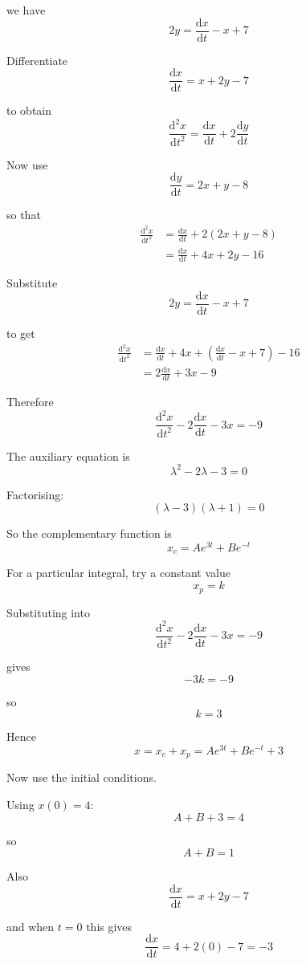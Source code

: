 \documentclass[leqno]{article}
\begin{document}
\begin{enumerate}[
  label=\textbf{\arabic*.},
  leftmargin=*,
  topsep=0pt,
  partopsep=0pt,
  parsep=0pt
]
\begin{djsSolution}
\begin{enumerate}[label=\textbf{(\alph*)}]
  we have
  \[
  2y=\frac{\mathrm{d}x}{\mathrm{d}t}-x+7
  \]

  Differentiate
  \[
  \frac{\mathrm{d}x}{\mathrm{d}t}=x+2y-7
  \]

  to obtain
  \[
  \frac{\mathrm{d}^2x}{\mathrm{d}t^2}
  =
  \frac{\mathrm{d}x}{\mathrm{d}t}
  +2\frac{\mathrm{d}y}{\mathrm{d}t}
  \]

  Now use
  \[
  \frac{\mathrm{d}y}{\mathrm{d}t}=2x+y-8
  \]

  so that
  \begin{align*}
  \frac{\mathrm{d}^2x}{\mathrm{d}t^2}
  &=\frac{\mathrm{d}x}{\mathrm{d}t}+2(2x+y-8)\\
  &=\frac{\mathrm{d}x}{\mathrm{d}t}+4x+2y-16
  \end{align*}

  Substitute
  \[
  2y=\frac{\mathrm{d}x}{\mathrm{d}t}-x+7
  \]

  to get
  \begin{align*}
  \frac{\mathrm{d}^2x}{\mathrm{d}t^2}
  &=\frac{\mathrm{d}x}{\mathrm{d}t}+4x+\left(\frac{\mathrm{d}x}{\mathrm{d}t}-x+7\right)-16\\
  &=2\frac{\mathrm{d}x}{\mathrm{d}t}+3x-9
  \end{align*}

  Therefore
  \[
  \frac{\mathrm{d}^2x}{\mathrm{d}t^2}-2\frac{\mathrm{d}x}{\mathrm{d}t}-3x=-9
  \]

  The auxiliary equation is
  \[
  \lambda^2-2\lambda-3=0
  \]

  Factorising:
  \[
  (\lambda-3)(\lambda+1)=0
  \]

  So the complementary function is
  \[
  x_c=Ae^{3t}+Be^{-t}
  \]

  For a particular integral, try a constant value
  \[
  x_p=k
  \]

  Substituting into
  \[
  \frac{\mathrm{d}^2x}{\mathrm{d}t^2}-2\frac{\mathrm{d}x}{\mathrm{d}t}-3x=-9
  \]

  gives
  \[
  -3k=-9
  \]

  so
  \[
  k=3
  \]

  Hence
  \[
  x=x_c+x_p=Ae^{3t}+Be^{-t}+3
  \]

  Now use the initial conditions.

  Using $x(0)=4$:
  \[
  A+B+3=4
  \]

  so
  \[
  A+B=1
  \]

  Also
  \[
  \frac{\mathrm{d}x}{\mathrm{d}t}=x+2y-7
  \]

  and when $t=0$ this gives
  \[
  \frac{\mathrm{d}x}{\mathrm{d}t}=4+2(0)-7=-3
  \]


\end{enumerate}
\end{djsSolution}
\end{enumerate}
\end{document}
